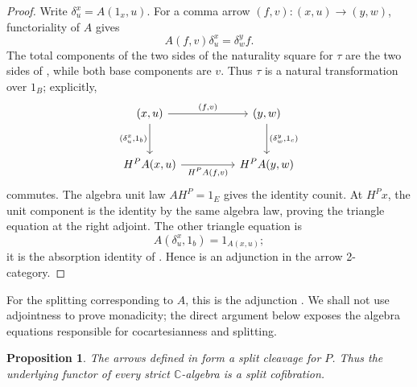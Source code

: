\documentclass[11pt]{article}
\theoremstyle{plain}
\newtheorem{proposition}[theorem]{Proposition}
\theoremstyle{definition}
\theoremstyle{remark}
\newcommand{\C}{\mathbb{C}}
\numberwithin{equation}{section}
\begin{document}
\begin{proof}
Write $\delta^{x}_{u}=A(1_x,u)$.  For a comma arrow
$(f,v)\colon(x,u)\to(y,w)$, functoriality of $A$ gives
\begin{equation}
  A(f,v)\delta^{x}_{u}=\delta^{y}_{w}f.
  \label{eq:algebra-unit-naturality}
\end{equation}
The total components of the two sides of the naturality square for
$\tau$ are the two sides of , while
both base components are $v$.  Thus $\tau$ is a natural transformation
over $1_B$; explicitly,
\begin{equation*}
\begin{tikzcd}[column sep=huge,row sep=large]
(x,u) \arrow[r,"{(f,v)}"]
  \arrow[d,"{(\delta^x_u,1_b)}"']
& (y,w) \arrow[d,"{(\delta^y_w,1_c)}"] \\
H^PA(x,u) \arrow[r,"{H^PA(f,v)}"']
& H^PA(y,w)
\end{tikzcd}
\end{equation*}
commutes.  The algebra unit law $AH^{P}=1_E$ gives the identity
counit.  At $H^{P}x$, the unit component is the identity by the same
algebra law, proving the triangle equation at the right adjoint.  The
other triangle equation is
\begin{equation*}
  A(\delta^{x}_{u},1_b)=1_{A(x,u)};
\end{equation*}
it is the absorption identity of .  Hence
 is an adjunction in the arrow
2-category.
\end{proof}

For the splitting corresponding to $A$, this is the adjunction
.  We shall not use adjointness to prove
monadicity; the direct argument below exposes the algebra equations
responsible for cocartesianness and splitting.

\begin{proposition}\label{prop:algebra-gives-splitting}
The arrows defined in  form a split cleavage for
$P$.  Thus the underlying functor of every strict $\C$-algebra is a
split cofibration.
\end{proposition}
\end{document}
